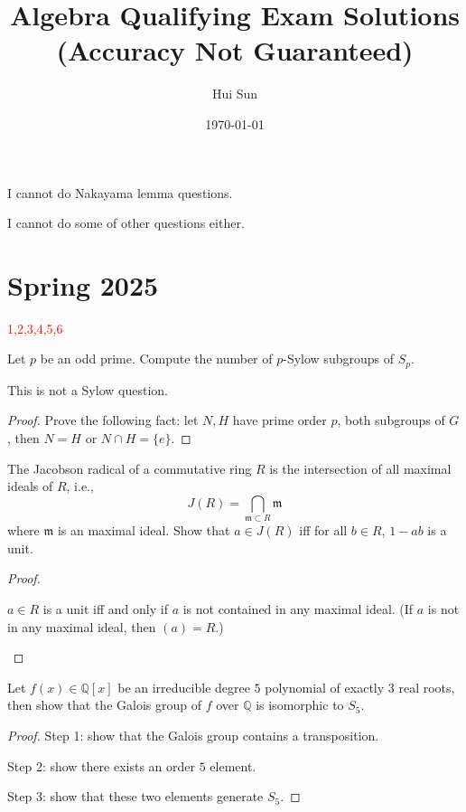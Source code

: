 \documentclass[openany]{book}
\title{Algebra Qualifying Exam Solutions
\\ 
\vspace{0.4cm}
\large (Accuracy Not Guaranteed)}
\date{\today}
\author{Hui Sun}
\newcommand{\Q}{\mathbb{Q}}
\begin{document}
\maketitle

\tableofcontents
\newpage


\begin{warn}
    I cannot do Nakayama lemma questions.
\end{warn}

\begin{warn}
    I cannot do some of other questions either.
\end{warn}




\chapter{Spring 2025}


\textcolor{red}{1,2,3,4,5,6}


\begin{prob}[Q1]
    Let $p$ be an odd prime. Compute the number of $p$-Sylow subgroups of $S_p$. 
\end{prob}
\begin{warn}
    This is not a Sylow question. 
\end{warn}
\begin{proof}
    Prove the following fact: let $N,H$ have prime order $p$, both subgroups of $G$, then $N=H$ or $N\cap H=\{e\}$.
\end{proof}



\begin{prob}[Q2]
    The Jacobson radical of a commutative ring $R$ is the intersection of all maximal ideals of $R$, i.e., 
    \begin{equation*}
        J(R)=\bigcap_{\mathfrak{m}\subset R} \mathfrak{m}
    \end{equation*}
    where $\mathfrak{m}$ is an maximal ideal. Show that $a\in J(R)$ iff for all $b\in R$, $1-ab$ is a unit.
\end{prob}
\begin{proof}
    \begin{lem}
        $a\in R$ is a unit iff and only if $a$ is not contained in any maximal ideal. (If $a$ is not in any maximal ideal, then $(a)=R$.)
    \end{lem}
\end{proof}

\begin{prob}[Q3]
    Let $f(x)\in\Q[x]$ be an irreducible degree $5$ polynomial of exactly $3$ real roots, then show that the Galois group of $f$ over $\Q$ is isomorphic to $S_5$.
\end{prob}
\begin{proof}
    Step 1: show that the Galois group contains a transposition.
    
    Step 2: show there exists an order $5$ element.

    Step 3: show that these two elements generate $S_5$.
\end{proof}
\end{document}
